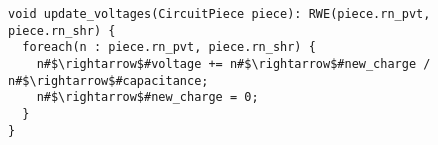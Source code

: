 \begin{lstlisting}[float={t},label={lst:code_ex},caption={Circuit simulation.}]
void update_voltages(CircuitPiece piece): RWE(piece.rn_pvt, piece.rn_shr) {
  foreach(n : piece.rn_pvt, piece.rn_shr) {
    n#$\rightarrow$#voltage += n#$\rightarrow$#new_charge / n#$\rightarrow$#capacitance;
    n#$\rightarrow$#new_charge = 0;
  }
}
\end{lstlisting}
